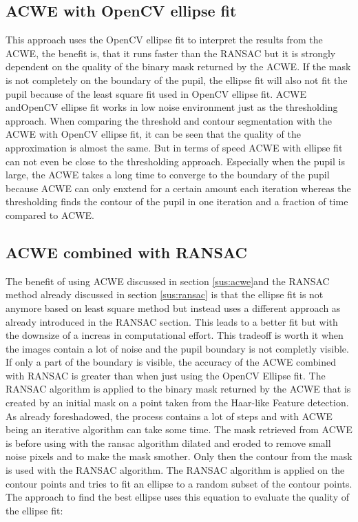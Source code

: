 \subsection{ACWE with OpenCV ellipse fit}
This approach uses the OpenCV ellipse fit to interpret the results from the ACWE, the benefit is, that it runs faster than the RANSAC but it is strongly dependent on the quality of the binary mask returned by the ACWE. If the mask is not completely on the boundary of the pupil, the ellipse fit will also not fit the pupil because of the least square fit used in OpenCV ellipse fit.  ACWE andOpenCV ellipse fit works in low noise environment just as the thresholding approach. When comparing the threshold and contour segmentation with the ACWE with OpenCV ellipse fit, it can be seen that the quality of the approximation is almost the same. But in terms of speed ACWE with ellipse fit can not even be close to the thresholding approach. Especially when the pupil is large, the ACWE takes a long time to converge to the boundary of the pupil because ACWE can only enxtend for a certain amount each iteration whereas the thresholding finds the contour of the pupil in one iteration and a fraction of time compared to ACWE.


\subsection{ACWE combined with RANSAC}
\label{sus:acwe_ransac}
The benefit of using ACWE discussed in section \ref{sus:acwe}and the RANSAC method already discussed in section \ref{sus:ransac} is that the ellipse fit is not anymore based on least square method but instead uses a different approach as already introduced in the RANSAC section. This leads to a better fit but with the downsize of a increas in computational effort. This tradeoff is worth it when the images contain a lot of noise and the pupil boundary is not completly visible. If only a part of the boundary is visible, the accuracy of the ACWE combined with RANSAC is greater than when just using the OpenCV Ellipse fit. The RANSAC algorithm is applied to the binary mask returned by the ACWE that is created by an initial mask on a point taken from the Haar-like Feature detection. As already foreshadowed, the process contains a lot of steps and with ACWE being an iterative algorithm can take some time. The mask retrieved from ACWE is before using with the ransac algorithm dilated and eroded to remove small noise pixels and to make the mask smother. Only then the contour from the mask is used with the RANSAC algorithm. The RANSAC algorithm is applied on the contour points and tries to fit an ellipse to a random subset of the contour points. The approach to find the best ellipse uses this equation to evaluate the quality of the ellipse fit: 


